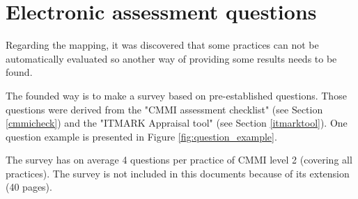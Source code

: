 











\section{Electronic assessment questions} \label{sec:question}

Regarding the mapping, it was discovered  that some practices can not be automatically evaluated so another way of providing some results needs to be found.

The founded way is to make a survey based on pre-established questions. Those questions were derived from the "CMMI assessment checklist" (see Section \ref{cmmicheck}) and  the "ITMARK Appraisal tool" (see Section \ref{itmarktool}). One question example is presented in Figure \ref{fig:question_example}.


The survey has on average 4 questions per practice of CMMI level 2 (covering all practices). The survey is not included in this documents because of its extension (40 pages).

